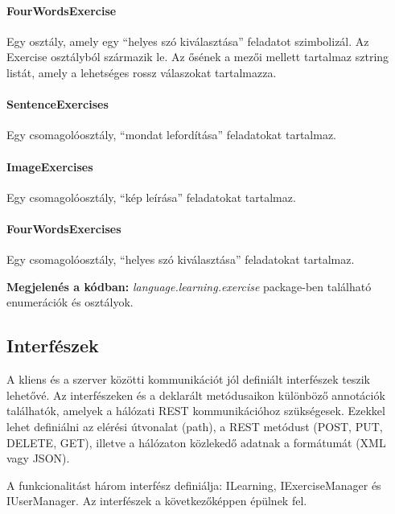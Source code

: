 \documentclass[11pt, a4paper]{article}
\begin{document}
    \paragraph{FourWordsExercise} Egy osztály, amely egy ``helyes szó kiválasztása'' feladatot szimbolizál. Az Exercise osztályból származik le. Az ősének a mezői mellett tartalmaz sztring listát, amely a lehetséges rossz válaszokat tartalmazza.
    
    \paragraph{SentenceExercises} Egy csomagolóosztály, ``mondat lefordítása'' feladatokat tartalmaz.
    
    \paragraph{ImageExercises} Egy csomagolóosztály, ``kép leírása'' feladatokat tartalmaz.
    
    \paragraph{FourWordsExercises} Egy csomagolóosztály, ``helyes szó kiválasztása'' feladatokat tartalmaz.
    
    \textbf{Megjelenés a kódban:} \textit{language.learning.exercise} package-ben található enumerációk és osztályok.
    
    \subsection{Interfészek}
    \label{sec:interfészek}
    
    A kliens és a szerver közötti kommunikációt jól definiált interfészek teszik lehetővé. Az interfészeken és a deklarált metódusaikon különböző annotációk találhatók, amelyek a hálózati REST kommunikációhoz szükségesek. Ezekkel lehet definiálni az elérési útvonalat (path), a REST metódust (POST, PUT, DELETE, GET), illetve a hálózaton közlekedő adatnak a formátumát (XML vagy JSON).
    
    A funkcionalitást három interfész definiálja: ILearning, IExerciseManager és IUserManager. Az interfészek a következőképpen épülnek fel.
    
\end{document}

